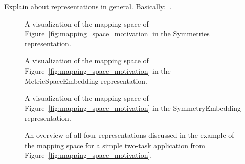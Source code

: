 Explain about representations in general. Basically:~\cite{goens_mcsoc18}.

\begin{figure}[h]
	\centering
  \resizebox{0.55\textwidth}{!}{
    \begin{tikzpicture}[x=1pt,y=1pt]
      
    \end{tikzpicture}
    }
	\caption{A visualization of the mapping space of Figure~\ref{fig:mapping_space_motivation} in the Symmetries representation.}
	\label{fig:example_space_symmetries}
\end{figure}
\begin{figure}[h]
	\centering
  \resizebox{0.55\textwidth}{!}{
    \begin{tikzpicture}[x=1pt,y=1pt]
      
    \end{tikzpicture}
  }
	\caption{A visualization of the mapping space of Figure~\ref{fig:mapping_space_motivation} in the MetricSpaceEmbedding representation.}
	\label{fig:example_space_embedding}
\end{figure}
\begin{figure}[h]
	\centering
  \resizebox{0.55\textwidth}{!}{
    \begin{tikzpicture}[x=1pt,y=1pt]
    
    \end{tikzpicture}
  }
	\caption{A visualization of the mapping space of Figure~\ref{fig:mapping_space_motivation} in the SymmetryEmbedding representation.}
	\label{fig:example_space_symmetries_embedding}
\end{figure}


\begin{figure}[h]
	\centering
\resizebox{1.00\textwidth}{!}{
   \begin{tikzpicture}
     
   \end{tikzpicture}
 }
   \caption{An overview of all four representations discussed in the example of the mapping space for a simple two-task application from Figure~\ref{fig:mapping_space_motivation}.}
   \label{fig:mapping_space_full}
\end{figure}
